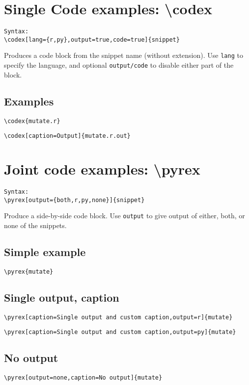 \documentclass{article}
\begin{document}
\section{Single Code examples: \textbackslash codex}

\begin{verbatim}
Syntax:
\codex[lang={r,py},output=true,code=true]{snippet}
\end{verbatim}

Produces a code block from the snippet name (without extension).
Use \verb+lang+ to specify the language, and optional \verb+output/code+ to disable either part of the block.

\subsection*{Examples}

\verb+\codex{mutate.r}+


\verb+\codex[caption=Output]{mutate.r.out}+

\newpage

\section{Joint code examples: \textbackslash pyrex}


\begin{verbatim}
Syntax:
\pyrex[output={both,r,py,none}]{snippet}
\end{verbatim}

Produce a side-by-side code block. Use \verb+output+ to give output of either, both, or none of the snippets. 

\subsection*{Simple example}

\verb+\pyrex{mutate}+

\newpage
\subsection*{Single output, caption}

\verb+\pyrex[caption=Single output and custom caption,output=r]{mutate}+


\verb+\pyrex[caption=Single output and custom caption,output=py]{mutate}+

\newpage
\subsection*{No output}

\verb+\pyrex[output=none,caption=No output]{mutate}+
\end{document}
